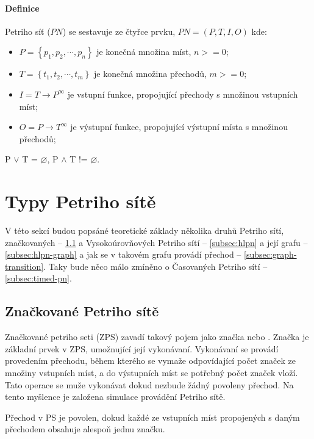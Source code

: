 \paragraph{Definice}

Petriho síť ($PN$) se sestavuje ze čtyřce prvku, $PN = \left(P, T, I, O\right)$ kde:
  \begin{itemize}
    \item $P = \left\{p_1, p_2, \cdots , p_n\right\}$ je konečná množina míst, $n >= 0$; \\
    \item $T = \left\{t_1, t_2, \cdots , t_m\right\}$ je konečná množina přechodů, $m >= 0$; \\
    \item $I = T \rightarrow P^\infty$ je vstupní funkce, propojující přechody s množinou vstupních míst; \\
    \item $O = P \rightarrow T^\infty$ je výstupní funkce, propojující výstupní místa s množinou přechodů; \\
  \end{itemize}
P $\vee$ T = $\varnothing$, P $\wedge$ T != $\varnothing$.

\section{Typy Petriho sítě}

V této sekcí budou popsáné teoretické základy několika druhů Petriho sítí, značkovaných -- \ref{subsec:marked-pn} a Vysokoúrovňových Petriho sítí -- \ref{subsec:hlpn} a její grafu -- \ref{subsec:hlpn-graph} a jak se v takovém grafu provádí přechod -- \ref{subsec:graph-transition}. Taky bude něco málo zmíněno o Časovaných Petriho sítí -- \ref{subsec:timed-pn}.

\subsection{Značkované Petriho sítě}
\label{subsec:marked-pn}
Značkované petriho seti (ZPS) zavadí takový pojem jako značka nebo . Značka je základní prvek v ZPS, umožnující její vykonávaní. Vykonávaní se provádí provedením přechodu, během kterého se vymaže odpovídající počet značek ze množiny vstupních míst, a do výstupních míst se potřebný počet značek vloží. Tato operace se muže vykonávat dokud nezbude žádný povoleny přechod. Na tento myšlence je založena simulace provádění Petriho sítě.

Přechod v PS je povolen, dokud každé ze vstupních míst propojených s daným přechodem obsahuje alespoň jednu značku.

